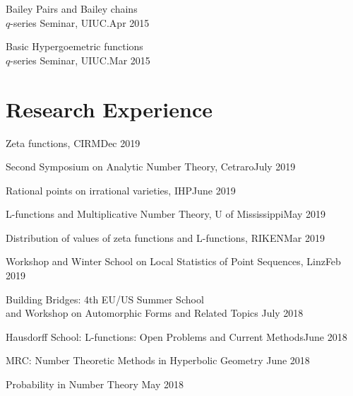 \documentclass[margin,line,pifont,palatino,courier]{res}
\newenvironment{list1}{
  \begin{list}{\ding{113}}{%
      \setlength{\itemsep}{0in}
      \setlength{\parsep}{0in} \setlength{\parskip}{0in}
      \setlength{\topsep}{0in} \setlength{\partopsep}{0in}
      \setlength{\leftmargin}{0.17in}}}{\end{list}}
\begin{document}
\begin{resume}
\begin{list1}
 \item{ Bailey Pairs and Bailey chains} \\	$q$-series  Seminar, UIUC.{\hfill Apr 2015}

 \item{ Basic Hypergoemetric functions} \\	$q$-series  Seminar, UIUC.{\hfill Mar 2015}
\end{list1}

\section{\sc Research Experience}
\begin{list1}
\item {Zeta functions, CIRM}{\hfill Dec 2019}

\item {Second Symposium on Analytic Number Theory, Cetraro}{\hfill July 2019}

\item {Rational points on irrational varieties, IHP}{\hfill June 2019}

\item {L-functions and Multiplicative Number Theory, U of Mississippi}{\hfill May 2019}

\item {Distribution of values of zeta functions and L-functions, RIKEN}{\hfill Mar 2019}

\item {Workshop and Winter School on Local Statistics of Point Sequences, Linz}{\hfill Feb 2019}

\item {Building Bridges: 4th EU/US Summer School \\and Workshop on Automorphic Forms and Related Topics
} {\hfill  July 2018}

\item {Hausdorff School: L-functions: Open Problems and Current Methods}{\hfill  June 2018}

\item {MRC: Number Theoretic Methods
	in Hyperbolic Geometry
	} {\hfill  June 2018}

\item {Probability in Number Theory}{ \hfill  May 2018}


\end{list1}
\end{resume}
\end{document}
